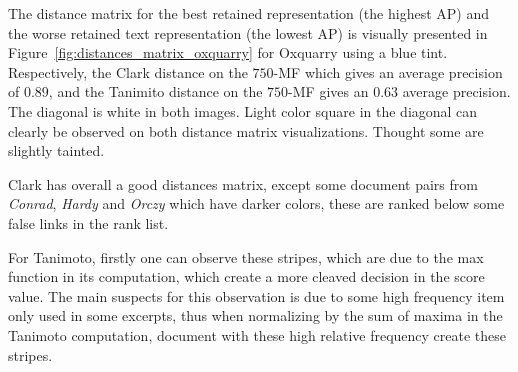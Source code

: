 The distance matrix for the best retained representation (the highest AP) and the worse retained text representation (the lowest AP) is visually presented in Figure~\ref{fig:distances_matrix_oxquarry} for Oxquarry using a blue tint.
Respectively, the Clark distance on the $750$-MF which gives an average precision of $0.89$, and the Tanimito distance on the $750$-MF gives an $0.63$ average precision.
The diagonal is white in both images.
Light color square in the diagonal can clearly be observed on both distance matrix visualizations.
Thought some are slightly tainted.

Clark has overall a good distances matrix, except some document pairs from \textit{Conrad}, \textit{Hardy} and \textit{Orczy} which have darker colors, these are ranked below some false links in the rank list.

For Tanimoto, firstly one can observe these stripes, which are due to the max function in its computation, which create a more cleaved decision in the score value.
The main suspects for this observation is due to some high frequency item only used in some excerpts, thus when normalizing by the sum of maxima in the Tanimoto computation, document with these high relative frequency create these stripes.

